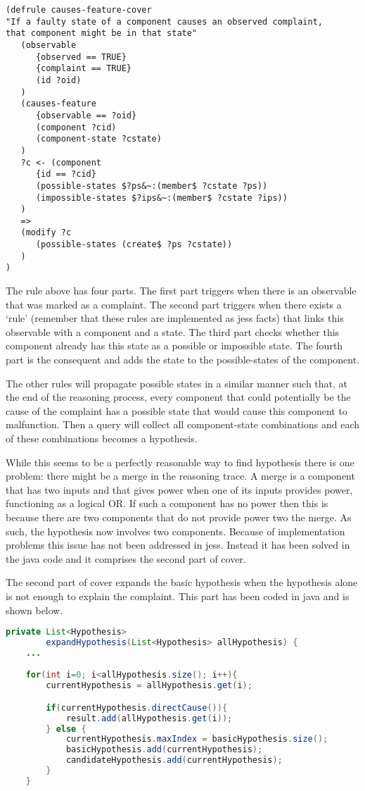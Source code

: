 \begin{verbatim}
(defrule causes-feature-cover
"If a faulty state of a component causes an observed complaint, 
that component might be in that state"
   (observable
      {observed == TRUE}
      {complaint == TRUE}
      (id ?oid)
   )
   (causes-feature
      {observable == ?oid}
      (component ?cid)
      (component-state ?cstate)
   )
   ?c <- (component
      {id == ?cid}
      (possible-states $?ps&~:(member$ ?cstate ?ps))
      (impossible-states $?ips&~:(member$ ?cstate ?ips))
   )
   =>
   (modify ?c
      (possible-states (create$ ?ps ?cstate))
   )
)
\end{verbatim}

The rule above has four parts. The first part triggers when there is an observable that was marked as a complaint. The second part triggers when there exists a `rule' (remember that these rules are implemented as jess facts) that links this observable with a component and a state. The third part checks whether this component already has this state as a possible or impossible state. The fourth part is the consequent and adds the state to the possible-states of the component.

The other rules will propagate possible states in a similar manner such that, at the end of the reasoning process, every component that could potentially be the cause of the complaint has a possible state that would cause this component to malfunction. Then a query will collect all component-state combinations and each of these combinations becomes a hypothesis.

While this seems to be a perfectly reasonable way to find hypothesis there is one problem: there might be a merge in the reasoning trace. A merge is a component that has two inputs and that gives power when one of its inputs provides power, functioning as a logical OR. If such a component has no power then this is because there are two components that do not provide power two the merge. As such, the hypothesis now involves two components. Because of implementation problems this issue has not been addressed in jess. Instead it has been solved in the java code and it comprises the second part of cover.

The second part of cover expands the basic hypothesis when the hypothesis alone is not enough to explain the complaint. This part has been coded in java and is shown below.

\begin{lstlisting}[language=Java]
private List<Hypothesis>
        expandHypothesis(List<Hypothesis> allHypothesis) {
    ...

    for(int i=0; i<allHypothesis.size(); i++){
        currentHypothesis = allHypothesis.get(i);

        if(currentHypothesis.directCause()){
            result.add(allHypothesis.get(i));
        } else {
            currentHypothesis.maxIndex = basicHypothesis.size();
            basicHypothesis.add(currentHypothesis);
            candidateHypothesis.add(currentHypothesis); 
        }
    }
\end{lstlisting}


